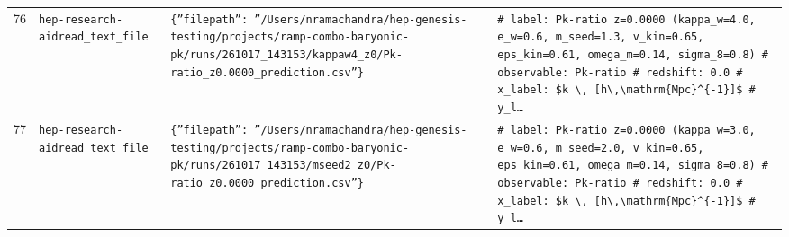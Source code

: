 \documentclass[11pt,a4paper]{article}
\begin{document}
\begin{longtable}{@{}p{}p{}p{}p{}@{}}
76 & \texttt{hep-research-aid}\newline\texttt{read\_\allowbreak{}text\_\allowbreak{}file} & \texttt{\{''filepath'':\allowbreak{} ''/\allowbreak{}Users/\allowbreak{}nramachandra/\allowbreak{}hep-genesis-testing/\allowbreak{}projects/\allowbreak{}ramp-combo-baryonic-pk/\allowbreak{}runs/\allowbreak{}261017\_\allowbreak{}143153/\allowbreak{}kappaw4\_\allowbreak{}z0/\allowbreak{}Pk-ratio\_\allowbreak{}z0.0000\_\allowbreak{}prediction.csv''\}\allowbreak{}} & \texttt{\# label:\allowbreak{} Pk-ratio z=\allowbreak{}0.0000 (kappa\_\allowbreak{}w=\allowbreak{}4.0,\allowbreak{} e\_\allowbreak{}w=\allowbreak{}0.6,\allowbreak{} m\_\allowbreak{}seed=\allowbreak{}1.3,\allowbreak{} v\_\allowbreak{}kin=\allowbreak{}0.65,\allowbreak{} eps\_\allowbreak{}kin=\allowbreak{}0.61,\allowbreak{} omega\_\allowbreak{}m=\allowbreak{}0.14,\allowbreak{} sigma\_\allowbreak{}8=\allowbreak{}0.8)\allowbreak{} \# observable:\allowbreak{} Pk-ratio \# redshift:\allowbreak{} 0.0 \# x\_\allowbreak{}label:\allowbreak{} \$k \textbackslash{}\allowbreak{},\allowbreak{} [h\textbackslash{}\allowbreak{},\allowbreak{}\textbackslash{}\allowbreak{}mathrm\{Mpc\}\allowbreak{}\textasciicircum{}\allowbreak{}\{-1\}\allowbreak{}]\allowbreak{}\$ \# y\_\allowbreak{}l\ldots{}\allowbreak{}} \\
77 & \texttt{hep-research-aid}\newline\texttt{read\_\allowbreak{}text\_\allowbreak{}file} & \texttt{\{''filepath'':\allowbreak{} ''/\allowbreak{}Users/\allowbreak{}nramachandra/\allowbreak{}hep-genesis-testing/\allowbreak{}projects/\allowbreak{}ramp-combo-baryonic-pk/\allowbreak{}runs/\allowbreak{}261017\_\allowbreak{}143153/\allowbreak{}mseed2\_\allowbreak{}z0/\allowbreak{}Pk-ratio\_\allowbreak{}z0.0000\_\allowbreak{}prediction.csv''\}\allowbreak{}} & \texttt{\# label:\allowbreak{} Pk-ratio z=\allowbreak{}0.0000 (kappa\_\allowbreak{}w=\allowbreak{}3.0,\allowbreak{} e\_\allowbreak{}w=\allowbreak{}0.6,\allowbreak{} m\_\allowbreak{}seed=\allowbreak{}2.0,\allowbreak{} v\_\allowbreak{}kin=\allowbreak{}0.65,\allowbreak{} eps\_\allowbreak{}kin=\allowbreak{}0.61,\allowbreak{} omega\_\allowbreak{}m=\allowbreak{}0.14,\allowbreak{} sigma\_\allowbreak{}8=\allowbreak{}0.8)\allowbreak{} \# observable:\allowbreak{} Pk-ratio \# redshift:\allowbreak{} 0.0 \# x\_\allowbreak{}label:\allowbreak{} \$k \textbackslash{}\allowbreak{},\allowbreak{} [h\textbackslash{}\allowbreak{},\allowbreak{}\textbackslash{}\allowbreak{}mathrm\{Mpc\}\allowbreak{}\textasciicircum{}\allowbreak{}\{-1\}\allowbreak{}]\allowbreak{}\$ \# y\_\allowbreak{}l\ldots{}\allowbreak{}} \\

\end{longtable}
\end{document}
